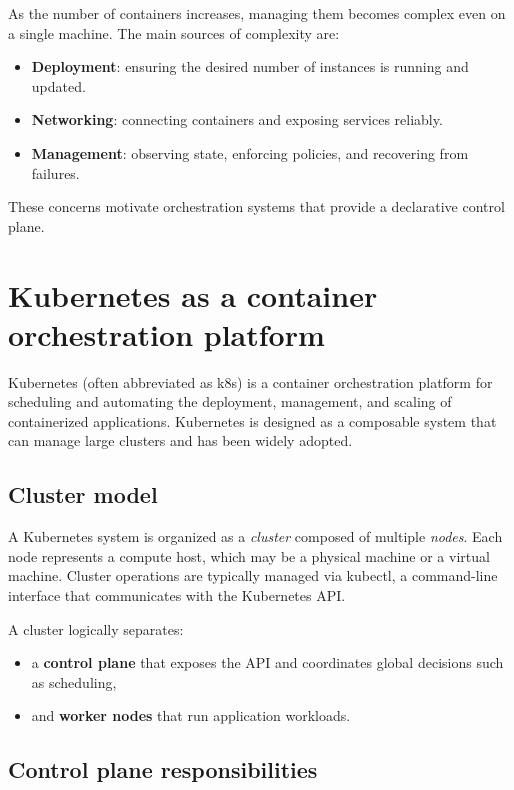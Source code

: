 \documentclass[11pt,a4paper,openany]{report}
\begin{document}
As the number of containers increases, managing them becomes complex even on a single machine. The main sources of complexity are:

\begin{itemize}
\item \textbf{Deployment}: ensuring the desired number of instances is running and updated.
\item \textbf{Networking}: connecting containers and exposing services reliably.
\item \textbf{Management}: observing state, enforcing policies, and recovering from failures.
\end{itemize}

These concerns motivate orchestration systems that provide a declarative control plane.

\section{Kubernetes as a container orchestration platform}

Kubernetes (often abbreviated as k8s) is a container orchestration platform for scheduling and automating the deployment, management, and scaling of containerized applications. Kubernetes is designed as a composable system that can manage large clusters and has been widely adopted.

\subsection{Cluster model}

A Kubernetes system is organized as a \emph{cluster} composed of multiple \emph{nodes}. Each node represents a compute host, which may be a physical machine or a virtual machine. Cluster operations are typically managed via kubectl, a command-line interface that communicates with the Kubernetes API.

A cluster logically separates:

\begin{itemize}
\item a \textbf{control plane} that exposes the API and coordinates global decisions such as scheduling,
\item and \textbf{worker nodes} that run application workloads.
\end{itemize}

\subsection{Control plane responsibilities}
\end{document}
